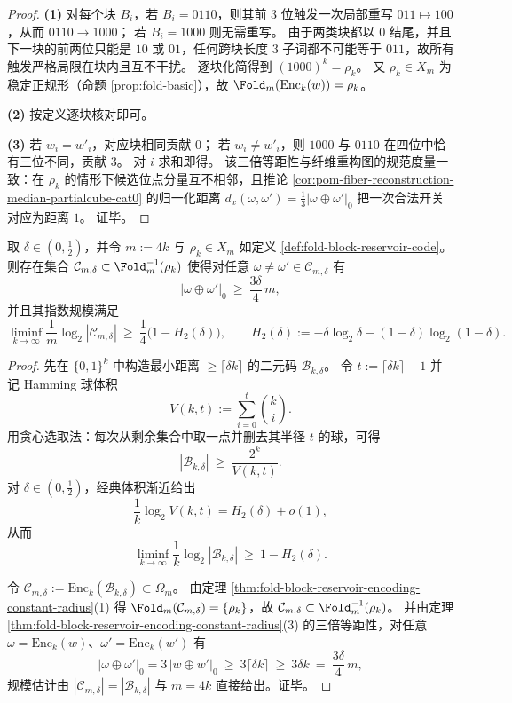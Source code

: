 \begin{proof}
\textbf{(1)}
对每个块 \(B_i\)，若 \(B_i=0110\)，则其前 \(3\) 位触发一次局部重写 \(011\mapsto 100\)，从而 \(0110\to 1000\)；
若 \(B_i=1000\) 则无需重写。
由于两类块都以 \(0\) 结尾，并且下一块的前两位只能是 \(10\) 或 \(01\)，任何跨块长度 \(3\) 子词都不可能等于 \(011\)，故所有触发严格局限在块内且互不干扰。
逐块化简得到 \((1000)^k=\rho_k\)。
又 \(\rho_k\in X_m\) 为稳定正规形（命题 \ref{prop:fold-basic}），故 \(\Fold_m(\mathrm{Enc}_k(w))=\rho_k\)。
\par
\textbf{(2)}
按定义逐块核对即可。
\par
\textbf{(3)}
若 \(w_i=w'_i\)，对应块相同贡献 \(0\)；
若 \(w_i\neq w'_i\)，则 \(1000\) 与 \(0110\) 在四位中恰有三位不同，贡献 \(3\)。
对 \(i\) 求和即得。
该三倍等距性与纤维重构图的规范度量一致：在 \(\rho_k\) 的情形下候选位点分量互不相邻，且推论 \ref{cor:pom-fiber-reconstruction-median-partialcube-cat0} 的归一化距离 \(d_x(\omega,\omega')=\frac13|\omega\oplus\omega'|_0\) 把一次合法开关对应为距离 \(1\)。
证毕。
\end{proof}

\begin{theorem}[水库纤维内的常相对距离打包下界]\label{thm:fold-reservoir-fiber-constant-relative-distance-packing}
取 \(\delta\in(0,\tfrac12)\)，并令 \(m:=4k\) 与 \(\rho_k\in X_m\) 如定义 \ref{def:fold-block-reservoir-code}。
则存在集合 \(\mathcal C_{m,\delta}\subset \Fold_m^{-1}(\rho_k)\) 使得对任意 \(\omega\neq \omega'\in\mathcal C_{m,\delta}\) 有
\[
|\omega\oplus \omega'|_0\ \ge\ \frac{3\delta}{4}\,m,
\]
并且其指数规模满足
\[
\liminf_{k\to\infty}\frac{1}{m}\log_2|\mathcal C_{m,\delta}|
\ \ge\
\frac14\bigl(1-H_2(\delta)\bigr),
\qquad
H_2(\delta):=-\delta\log_2\delta-(1-\delta)\log_2(1-\delta).
\]
\end{theorem}

\begin{proof}
先在 \(\{0,1\}^k\) 中构造最小距离 \(\ge \lceil \delta k\rceil\) 的二元码 \(\mathcal B_{k,\delta}\)。
令 \(t:=\lceil\delta k\rceil-1\) 并记 Hamming 球体积
\[
V(k,t):=\sum_{i=0}^{t}\binom{k}{i}.
\]
用贪心选取法：每次从剩余集合中取一点并删去其半径 \(t\) 的球，可得
\[
|\mathcal B_{k,\delta}|\ \ge\ \frac{2^k}{V(k,t)}.
\]
对 \(\delta\in(0,\tfrac12)\)，经典体积渐近给出
\[
\frac{1}{k}\log_2 V(k,t)=H_2(\delta)+o(1),
\]
从而
\[
\liminf_{k\to\infty}\frac{1}{k}\log_2|\mathcal B_{k,\delta}|\ \ge\ 1-H_2(\delta).
\]
\par
令 \(\mathcal C_{m,\delta}:=\mathrm{Enc}_k(\mathcal B_{k,\delta})\subset \Omega_m\)。
由定理 \ref{thm:fold-block-reservoir-encoding-constant-radius}(1) 得 \(\Fold_m(\mathcal C_{m,\delta})=\{\rho_k\}\)，故 \(\mathcal C_{m,\delta}\subset \Fold_m^{-1}(\rho_k)\)。
并由定理 \ref{thm:fold-block-reservoir-encoding-constant-radius}(3) 的三倍等距性，对任意 \(\omega=\mathrm{Enc}_k(w)\)、\(\omega'=\mathrm{Enc}_k(w')\) 有
\[
|\omega\oplus\omega'|_0=3\,|w\oplus w'|_0\ \ge\ 3\lceil\delta k\rceil\ \ge\ 3\delta k\ =\ \frac{3\delta}{4}\,m,
\]
规模估计由 \(|\mathcal C_{m,\delta}|=|\mathcal B_{k,\delta}|\) 与 \(m=4k\) 直接给出。证毕。
\end{proof}


